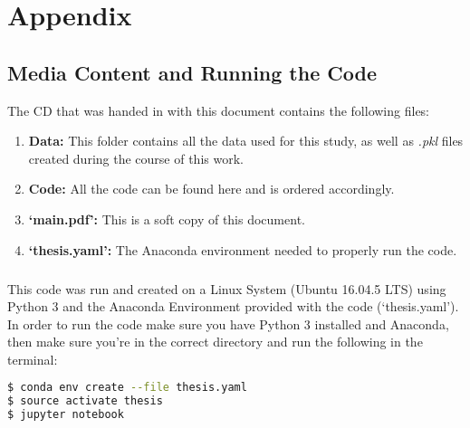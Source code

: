 \chapter{Appendix}
\section{Media Content and Running the Code}

\noindent The CD that was handed in with this document contains the following files:
\begin{enumerate}
	\item \textbf{Data:} This folder contains all the data used for this study, as well as \textit{.pkl} files created during the course of this work.
	\item \textbf{Code:} All the code can be found here and is ordered accordingly.
	\item \textbf{`main.pdf':} This is a soft copy of this document.
	\item \textbf{`thesis.yaml':} The Anaconda environment needed to properly run the code.
\end{enumerate}
\paragraph{ }This code was run and created on a Linux System (Ubuntu 16.04.5 LTS) using Python 3 and the Anaconda Environment provided with the code (`thesis.yaml'). In order to run the code make sure you have Python 3 installed and Anaconda, then make sure you're in the correct directory and run the following in the terminal:

\begin{lstlisting}[language=bash]
$ conda env create --file thesis.yaml
$ source activate thesis
$ jupyter notebook
\end{lstlisting}